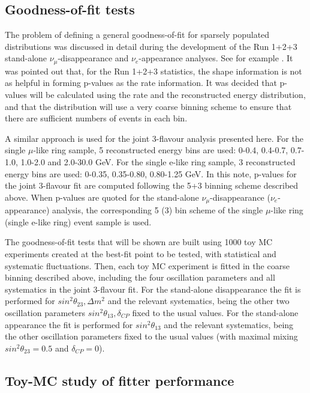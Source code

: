 \subsection{Goodness-of-fit tests}
\label{sec:goodness_of_fit}
The problem of defining a general goodness-of-fit for sparsely populated distributions
was discussed in detail during the development of the Run 1+2+3 stand-alone $\nu_\mu$-disappearance 
and $\nu_{e}$-appearance analyses. See for example \cite{KarlenPvalue}.
It was pointed out that, for the Run 1+2+3 statistics, the shape information is not
as helpful in forming p-values as the rate information.
It was decided that  p-values will be calculated using the rate and the reconstructed energy distribution,
and that the distribution will use a very coarse binning
scheme to ensure that there are sufficient numbers of events in each bin.

A similar approach is used for the joint 3-flavour analysis presented here.
For the single $\mu$-like ring sample, 5 reconstructed energy bins are used:
0-0.4, 0.4-0.7, 0.7-1.0, 1.0-2.0 and 2.0-30.0 GeV.
For the single e-like ring sample, 3 reconstructed energy bins are used:
0-0.35, 0.35-0.80, 0.80-1.25 GeV.
In this note, p-values for the joint 3-flavour fit are computed following 
the 5+3 binning scheme described above. When p-values are quoted for the stand-alone
$\nu_{\mu}$-disappearance ($\nu_{e}$-appearance) analysis, the corresponding 
5 (3) bin scheme of the single $\mu$-like ring (single e-like ring) event sample is used.

The goodness-of-fit tests that will be shown are built using 1000 toy MC experiments
created at the best-fit point to be tested, with statistical and systematic fluctuations.
Then, each toy MC experiment is fitted in the coarse binning described above, 
including the four oscillation parameters and all systematics in the joint 3-flavour fit.
For the stand-alone disappearance the fit is performed for $sin^{2}\theta_{23}, \Delta m^{2}$ 
and the relevant systematics, being the other two oscillation parameters $sin^{2}\theta_{13}, \delta_{CP}$
fixed to the usual values.
For the stand-alone appearance the fit is performed for $sin^{2}\theta_{13}$
and the relevant systematics, being the other oscillation parameters
fixed to the usual values (with maximal mixing $sin^{2}\theta_{23} = 0.5$ and $\delta_{CP}=0$).


%

\subsection{Toy-MC study of fitter performance}

